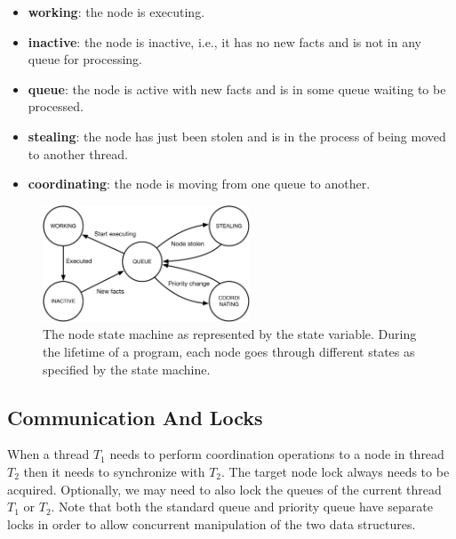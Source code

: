 \begin{itemize}
   \item \textbf{working}: the node is executing.
   \item \textbf{inactive}: the node is inactive, i.e., it has no new facts and is not in any
   queue for processing.
   \item \textbf{queue}: the node is active with new facts and is in some queue waiting
   to be processed.
   \item \textbf{stealing}: the node has just been stolen and is in the process of being
   moved to another thread.
   \item \textbf{coordinating}: the node is moving from one queue to another.
\end{itemize}

\begin{figure}[ht]
   \centering
   \includegraphics[width=0.55\textwidth]{figures/implementation/node_states.pdf}
   \caption{The node state machine as represented by the state variable. During
      the lifetime of a program, each node goes through different states as
      specified by the state machine.}
   \label{fig:implementation:node_states}
\end{figure}

\subsection{Communication And Locks}

When a thread $T_1$ needs to perform coordination operations to a node in thread
$T_2$ then it needs to synchronize with $T_2$. The target node lock always needs
to be acquired.  Optionally, we may need to also lock the queues of the current
thread $T_1$ or $T_2$.  Note that both the standard queue and priority
queue have separate locks in order to allow concurrent manipulation of the two
data structures.
